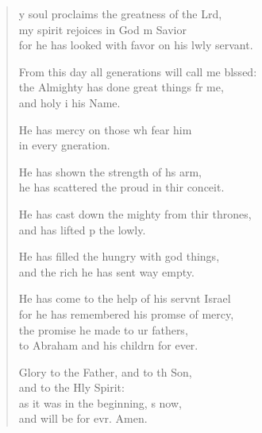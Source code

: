 \settowidth{\versewidth}{From this day all generations will call me blessed: +}
\begin{verse}%
  \begin{patverse}
y soul proclaims the greatness of the Lrd,\Flex\\
my spirit rejoices in God m Savior\Med\\
for he has looked with favor on his lwly servant.

From this day all generations will call me blssed:\Flex\\
the Almighty has done great things fr me,\Med\\
and holy i his Name.

He has mercy on those wh fear him\Med\\
in every gneration.

He has shown the strength of h\pointup{\i}s arm,\Med\\
he has scattered the proud in thir conceit.

He has cast down the mighty from thir thrones,\Med\\
and has lifted p the lowly.

He has filled the hungry with god things,\Med\\
and the rich he has sent way empty.

He has come to the help of his servnt Israel\Med\\
for he has remembered his promse of mercy,\\
the promise he made to ur fathers,\Med\\
to Abraham and his childrn for ever.

Glory to the Father, and to th Son,\Med\\
and to the Hly Spirit:\\
as it was in the beginning, \pointup{\i}s now,\Med\\
and will be for evr. Amen.
  \end{patverse}
\end{verse}
